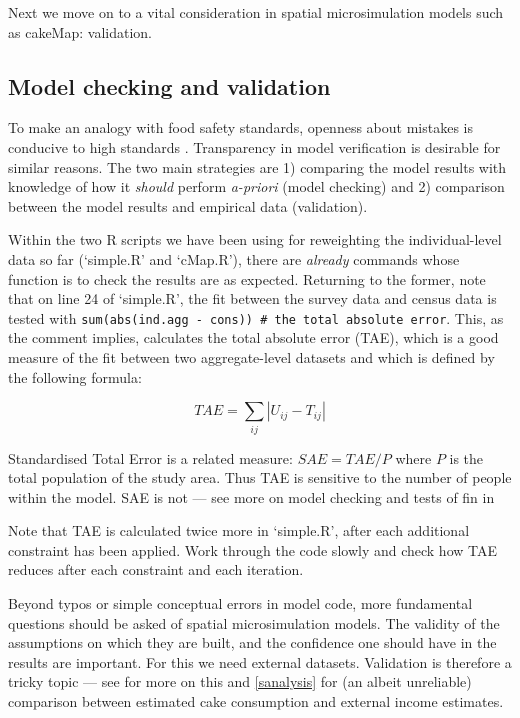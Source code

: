 \documentclass[a4paper, 11pt, twoside]{article}
\begin{document}
Next we move on to a vital consideration in
spatial microsimulation models such as cakeMap: validation.

\subsection{Model checking and validation}
\label{svalid}
To make an analogy with food safety standards, openness about mistakes is
conducive to high standards \citep{Powell2011}. Transparency in model
verification is desirable for similar reasons. The two main strategies are 1) 
comparing the model results with knowledge of how it \emph{should}
perform \emph{a-priori} (model checking) and 2) comparison between the model
results and empirical data (validation).

Within the two R scripts we have been using for reweighting the individual-level
data so far (`simple.R' and `cMap.R'),
there are \emph{already} commands whose function is to check the
results are as expected. Returning to the former, note that on line 24
of `simple.R', the fit between the survey data and census data is
tested with \texttt{sum(abs(ind.agg - cons)) \# the total absolute error}.
This, as the comment implies, calculates the total absolute error
(TAE), which is a good measure of the fit between two aggregate-level
datasets and which is defined by the following formula:

\begin{equation}
 TAE = \sum\limits_{ij}|U_{ij} - T_{ij}|
\end{equation}

Standardised Total Error is a related measure: $SAE = TAE/P$
where $P$ is the total population of the study area.
Thus TAE is sensitive to the number of people
within the model. SAE is not --- see more on model checking and tests of
fin in \citet{Lovelace2013-trs}

Note that TAE is calculated twice more in `simple.R', after each
additional constraint has been applied. Work through the code slowly and
check how TAE reduces after each constraint and each iteration.

Beyond typos or simple conceptual errors in model code, more fundamental
questions should be asked of spatial microsimulation models. The validity
of the assumptions on which they are built, and the confidence one should have
in the results are important. For this we need external datasets.
Validation is therefore a tricky topic --- see \citet{Edwards2009} for
more on this and \cref{sanalysis} for (an albeit unreliable) comparison
between estimated cake consumption and external income estimates.
\end{document}
